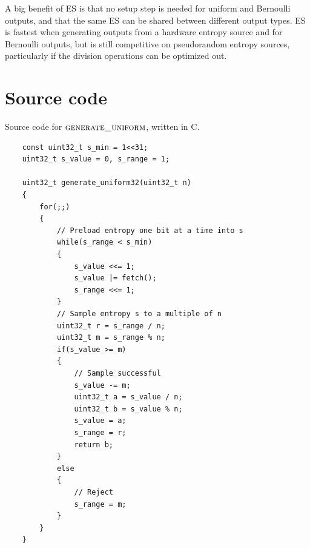 \documentclass[12pt]{article}
\begin{document}
A big benefit of ES is that no setup step is needed for uniform and Bernoulli outputs, and that the same ES can be shared between different output types. ES is fastest when generating outputs from a hardware entropy source and for Bernoulli outputs, but is still competitive on pseudorandom entropy sources, particularly if the division operations can be optimized out.



\printbibliography

\appendix

\section {Source code} \label{app:source-code}

Source code for $\textsc{generate\_uniform}$, written in C.

\begin{verbatim}
    const uint32_t s_min = 1<<31;
    uint32_t s_value = 0, s_range = 1;

    uint32_t generate_uniform32(uint32_t n)
    {
        for(;;)
        {
            // Preload entropy one bit at a time into s
            while(s_range < s_min)
            {
                s_value <<= 1;
                s_value |= fetch();
                s_range <<= 1;
            }
            // Sample entropy s to a multiple of n
            uint32_t r = s_range / n;
            uint32_t m = s_range % n;
            if(s_value >= m)
            {
                // Sample successful
                s_value -= m;
                uint32_t a = s_value / n;
                uint32_t b = s_value % n;
                s_value = a;
                s_range = r; 
                return b;
            }
            else
            {
                // Reject
                s_range = m;
            }
        }
    }
\end{verbatim}
\end{document}
